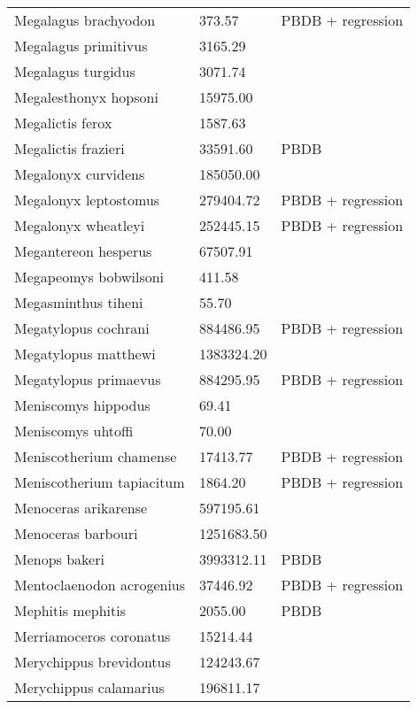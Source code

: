 \documentclass{article}
\begin{document}
\begin{center}
\begin{longtable}{p{} p{} p{} }
  Megalagus brachyodon & 373.57 & PBDB + regression \\ 
  Megalagus primitivus & 3165.29 & \cite{Tomiya2013} \\ 
  Megalagus turgidus & 3071.74 & \cite{Tomiya2013} \\ 
  Megalesthonyx hopsoni & 15975.00 & \cite{Hay1916} \\ 
  Megalictis ferox & 1587.63 & \cite{Tomiya2013} \\ 
  Megalictis frazieri & 33591.60 & PBDB \\ 
  Megalonyx curvidens & 185050.00 & \cite{McDonald2005} \\ 
  Megalonyx leptostomus & 279404.72 & PBDB + regression \\ 
  Megalonyx wheatleyi & 252445.15 & PBDB + regression \\ 
  Megantereon hesperus & 67507.91 & \cite{Tomiya2013} \\ 
  Megapeomys bobwilsoni & 411.58 & \cite{Tomiya2013} \\ 
  Megasminthus tiheni & 55.70 & \cite{Tomiya2013} \\ 
  Megatylopus cochrani & 884486.95 & PBDB + regression \\ 
  Megatylopus matthewi & 1383324.20 & \cite{Tomiya2013} \\ 
  Megatylopus primaevus & 884295.95 & PBDB + regression \\ 
  Meniscomys hippodus & 69.41 & \cite{Tomiya2013} \\ 
  Meniscomys uhtoffi & 70.00 & \cite{McKenna2011} \\ 
  Meniscotherium chamense & 17413.77 & PBDB + regression \\ 
  Meniscotherium tapiacitum & 1864.20 & PBDB + regression \\ 
  Menoceras arikarense & 597195.61 & \cite{Tomiya2013} \\ 
  Menoceras barbouri & 1251683.50 & \cite{Tomiya2013} \\ 
  Menops bakeri & 3993312.11 & PBDB \\ 
  Mentoclaenodon acrogenius & 37446.92 & PBDB + regression \\ 
  Mephitis mephitis & 2055.00 & PBDB \\ 
  Merriamoceros coronatus & 15214.44 & \cite{Tomiya2013} \\ 
  Merychippus brevidontus & 124243.67 & \cite{Tomiya2013} \\ 
  Merychippus calamarius & 196811.17 & \cite{Tomiya2013} \\ 

\end{longtable}
\end{center}
\end{document}
